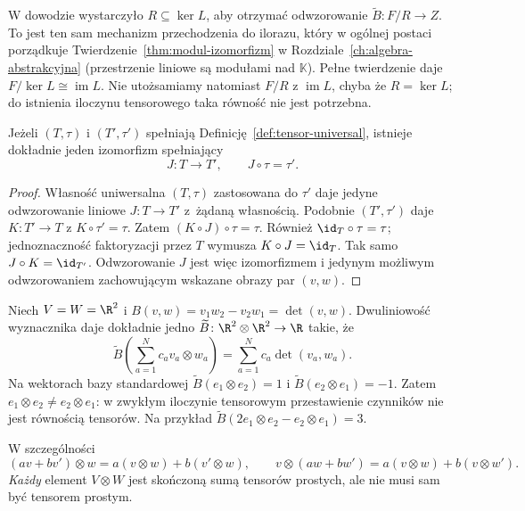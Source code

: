 \begin{uwaga}
\label{rem:tensor-iloraz-izomorfizm}
W dowodzie wystarczyło $R\subseteq\ker L$, aby otrzymać
odwzorowanie $\widetilde B:F/R\to Z$. To jest ten sam mechanizm
przechodzenia do ilorazu, który w ogólnej postaci
porządkuje Twierdzenie~\ref{thm:modul-izomorfizm}
w Rozdziale~\ref{ch:algebra-abstrakcyjna}
(przestrzenie liniowe są modułami nad $\mathbb K$).
Pełne twierdzenie daje $F/\ker L\cong\operatorname{im}L$.
Nie utożsamiamy natomiast $F/R$ z $\operatorname{im}L$,
chyba że $R=\ker L$; do istnienia iloczynu tensorowego
taka równość nie jest potrzebna.
\end{uwaga}

\begin{twierdzenie}[Jednoznaczność]
\label{thm:tensor-jednoznacznosc}
Jeżeli $(T,\tau)$ i $(T',\tau')$ spełniają
Definicję~\ref{def:tensor-universal}, istnieje dokładnie jeden
izomorfizm spełniający
\[
 J\colon T\to T',\qquad J\circ\tau=\tau'.
\]
\end{twierdzenie}
\begin{proof}
Własność uniwersalna $(T,\tau)$ zastosowana do $\tau'$ daje
jedyne odwzorowanie liniowe $J\colon T\to T'$ z~żądaną własnością.
Podobnie $(T',\tau')$ daje $K\colon T'\to T$ z
$K\circ\tau'=\tau$. Zatem $(K\circ J)\circ\tau=\tau$.
Również $\id_T\circ\tau=\tau$; jednoznaczność faktoryzacji
przez $T$ wymusza $K\circ J=\id_T$. Tak samo $J\circ K=\id_{T'}$.
Odwzorowanie $J$ jest więc izomorfizmem i jedynym możliwym odwzorowaniem
zachowującym wskazane obrazy par $(v,w)$.
\end{proof}

\begin{przyklad}
Niech $V=W=\R^2$ i
$B(v,w)=v_1w_2-v_2w_1=\det(v,w)$.
Dwuliniowość wyznacznika daje dokładnie jedno
$\widetilde B\colon\R^2\otimes\R^2\to\R$ takie, że
\[
 \widetilde B\!\left(\sum_{a=1}^N c_a v_a\otimes w_a\right)
 =\sum_{a=1}^N c_a\det(v_a,w_a).
\]
Na wektorach bazy standardowej
$\widetilde B(e_1\otimes e_2)=1$ i
$\widetilde B(e_2\otimes e_1)=-1$.
Zatem $e_1\otimes e_2\ne e_2\otimes e_1$:
w zwykłym iloczynie tensorowym przestawienie czynników
nie jest równością tensorów. Na przykład
$\widetilde B(2e_1\otimes e_2-e_2\otimes e_1)=3$.
\end{przyklad}

W szczególności
\begin{equation}\label{eq:tensor-biliniowosc}
 (av+bv')\otimes w=a(v\otimes w)+b(v'\otimes w),\qquad
 v\otimes(aw+bw')=a(v\otimes w)+b(v\otimes w').
\end{equation}
\emph{Każdy} element $V\otimes W$ jest skończoną sumą tensorów
prostych, ale nie musi sam być tensorem prostym.

